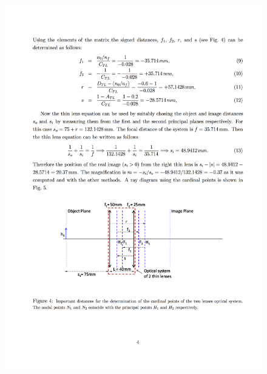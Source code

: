 \begin{figure}[h]
	
	\centering
	\includegraphics[width=1.0\linewidth]{__Images/09/Glytsis2014_4.png}
\end{figure}

